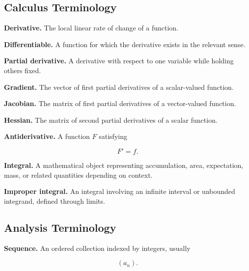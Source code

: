 \subsection{Calculus Terminology}
\label{subsec:calculus-terminology-reference}

\textbf{Derivative.}
The local linear rate of change of a function.

\medskip

\textbf{Differentiable.}
A function for which the derivative exists in the relevant sense.

\medskip

\textbf{Partial derivative.}
A derivative with respect to one variable while holding others fixed.

\medskip

\textbf{Gradient.}
The vector of first partial derivatives of a scalar-valued function.

\medskip

\textbf{Jacobian.}
The matrix of first partial derivatives of a vector-valued function.

\medskip

\textbf{Hessian.}
The matrix of second partial derivatives of a scalar function.

\medskip

\textbf{Antiderivative.}
A function \(F\) satisfying

\[
\boxed{
F'=f.
}
\]

\medskip

\textbf{Integral.}
A mathematical object representing accumulation, area, expectation, mass,
or related quantities depending on context.

\medskip

\textbf{Improper integral.}
An integral involving an infinite interval or unbounded integrand, defined
through limits.

\subsection{Analysis Terminology}
\label{subsec:analysis-terminology-reference}

\textbf{Sequence.}
An ordered collection indexed by integers, usually

\[
\boxed{
(a_n).
}
\]


